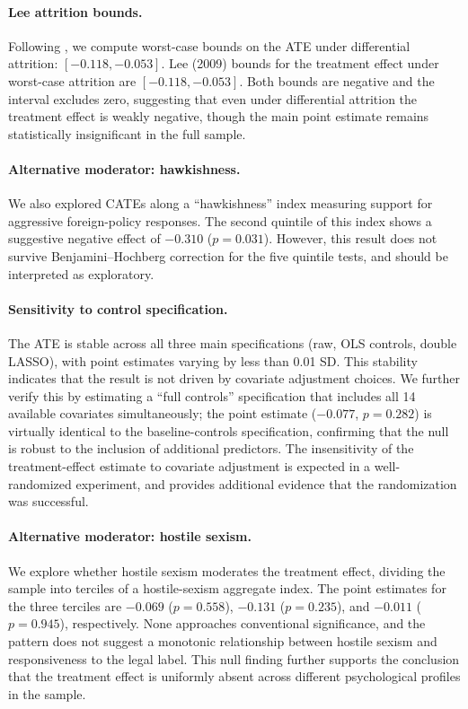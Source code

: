 \documentclass[12pt]{article}
\begin{document}
\paragraph{Lee attrition bounds.} Following \citet{lee2009training}, we compute worst-case bounds on the ATE under differential attrition: $[-0.118, -0.053]$. Lee (2009) bounds for the treatment effect under worst-case attrition are $[-0.118, -0.053]$. Both bounds are negative and the interval excludes zero, suggesting that even under differential attrition the treatment effect is weakly negative, though the main point estimate remains statistically insignificant in the full sample.

\paragraph{Alternative moderator: hawkishness.} We also explored CATEs along a ``hawkishness'' index measuring support for aggressive foreign-policy responses. The second quintile of this index shows a suggestive negative effect of $-0.310$ ($p = 0.031$). However, this result does not survive Benjamini--Hochberg correction for the five quintile tests, and should be interpreted as exploratory.

\paragraph{Sensitivity to control specification.} The ATE is stable across all three main specifications (raw, OLS controls, double LASSO), with point estimates varying by less than 0.01 SD. This stability indicates that the result is not driven by covariate adjustment choices. We further verify this by estimating a ``full controls'' specification that includes all 14 available covariates simultaneously; the point estimate ($-0.077$, $p = 0.282$) is virtually identical to the baseline-controls specification, confirming that the null is robust to the inclusion of additional predictors. The insensitivity of the treatment-effect estimate to covariate adjustment is expected in a well-randomized experiment, and provides additional evidence that the randomization was successful.

\paragraph{Alternative moderator: hostile sexism.} We explore whether hostile sexism moderates the treatment effect, dividing the sample into terciles of a hostile-sexism aggregate index. The point estimates for the three terciles are $-0.069$ ($p = 0.558$), $-0.131$ ($p = 0.235$), and $-0.011$ ($p = 0.945$), respectively. None approaches conventional significance, and the pattern does not suggest a monotonic relationship between hostile sexism and responsiveness to the legal label. This null finding further supports the conclusion that the treatment effect is uniformly absent across different psychological profiles in the sample.
\end{document}
